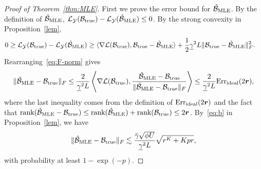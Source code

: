 \documentclass[12pt]{article}
\theoremstyle{definition}
\begin{document}
\begin{proof}[Proof of Theorem~\ref{thm:MLE}]
First we prove the error bound for $\MLEB$. By the definition of $\MLEB$, $\tL_{\tY}(\trueB)-\tL_{\tY}(\MLEB)\leq 0$. By the strong convexity in Proposition~\ref{lem},
\begin{align}\label{eq:F-norm}
0&\geq \tL_{\tY}(\trueB)- \tL_{\tY}(\MLEB)  \geq \langle \nabla \tL(\tB_{\text{true}}), \trueB-\MLEB \rangle+{1\over 2}\underline{\gamma}^2L\FnormSize{}{\trueB-\MLEB}^2.
\end{align}
Rearranging~\eqref{eq:F-norm} gives
\[
\FnormSize{}{\MLEB-\trueB}\leq {2\over \underline{\gamma}^2L} \left\langle \nabla \tL(\tB_{\text{true}}), {\MLEB-\trueB\over\FnormSize{}{\MLEB-\trueB}} \right\rangle\leq {2\over \underline{\gamma}^2L}  \text{Err}_{\text{ideal}}(2\mr),
\]
where the last inequality comes from the definition of $\text{Err}_{\text{ideal}}(2\mr)$ and the fact that $\text{rank}(\MLEB-\trueB)\leq \text{rank}(\MLEB)+\text{rank}(\trueB)\leq 2\mr$. By~\eqref{eq:b} in Proposition~\ref{lem}, we have 
\begin{equation}\label{eq:Bbound}
\FnormSize{}{\MLEB-\trueB} \lesssim {\bar \gamma \sqrt{\phi U}\over \underline{\gamma}^2 L}\sqrt{r^K+Kpr},
\end{equation}
with probability at least $1-\exp(-p)$.


\end{proof}
\end{document}
